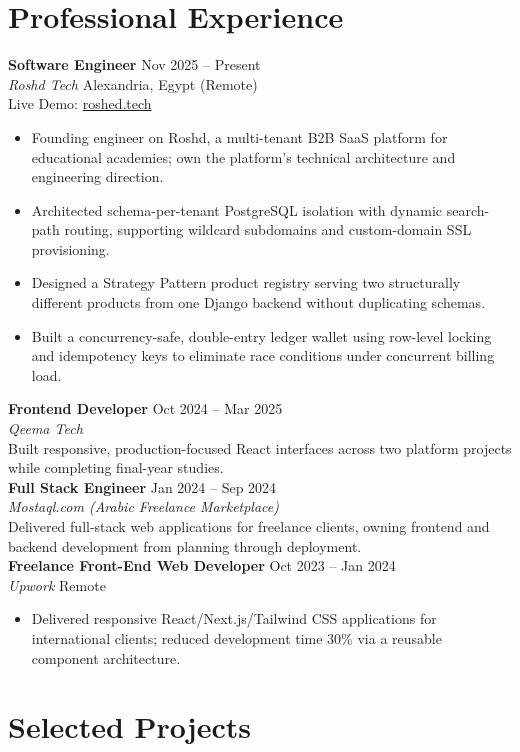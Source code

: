 \documentclass[10pt,letterpaper]{article}
\newcommand{\sectionrule}{\vspace{-1pt}{\color{hairline}\hrule height 0.6pt}\vspace{2pt}}
\newcommand{\entryHeading}[4]{%
  \textbf{#1} \hfill {\small\color{muted}#2}\\
  {\small\color{muted}\textit{#3}} \hfill {\small\color{muted}#4}\\[0pt]
}
\newcommand{\linkLine}[3]{{\footnotesize\color{muted}#1: }{\footnotesize\href{#2}{#3}}\\[0pt]}
\newcommand{\shortEntry}[4]{%
  \textbf{#1} \hfill {\small\color{muted}#2}\\
  {\small\color{muted}\textit{#3}}\\
  {\small #4}\\[1pt]
}
\begin{document}
\section*{Professional Experience}
\sectionrule

\entryHeading{Software Engineer}{Nov 2025 -- Present}{Roshd Tech}{Alexandria, Egypt (Remote)}
\linkLine{Live Demo}{https://roshed.tech/}{roshed.tech}
{\small
\begin{itemize}
    \item Founding engineer on Roshd, a multi-tenant B2B SaaS platform for educational academies; own the
    platform's technical architecture and engineering direction.
    \item Architected schema-per-tenant PostgreSQL isolation with dynamic search-path routing, supporting
    wildcard subdomains and custom-domain SSL provisioning.
    \item Designed a Strategy Pattern product registry serving two structurally different products from one
    Django backend without duplicating schemas.
    \item Built a concurrency-safe, double-entry ledger wallet using row-level locking and idempotency keys
    to eliminate race conditions under concurrent billing load.
\end{itemize}
}

\shortEntry{Frontend Developer}{Oct 2024 -- Mar 2025}{Qeema Tech}{Built responsive, production-focused React interfaces across two platform projects while completing final-year studies.}

\shortEntry{Full Stack Engineer}{Jan 2024 -- Sep 2024}{Mostaql.com (Arabic Freelance Marketplace)}{Delivered full-stack web applications for freelance clients, owning frontend and backend development from planning through deployment.}

\entryHeading{Freelance Front-End Web Developer}{Oct 2023 -- Jan 2024}{Upwork}{Remote}
{\small
\begin{itemize}
    \item Delivered responsive React/Next.js/Tailwind CSS applications for international clients; reduced
    development time 30\% via a reusable component architecture.
\end{itemize}
}

\section*{Selected Projects}
\sectionrule
\end{document}
